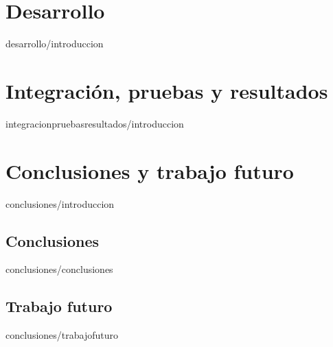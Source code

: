 \documentclass[epsbased,copyright,final,printable,covers,extendedindex,firstnumbered,tfg,gnuplot]{tfgtfmthesisuam}
\begin{document}
\chapter{Desarrollo\label{CAP:DESARROLLO}}{desarrollo/introduccion}

\chapter{Integración, pruebas y resultados\label{CAP:INTEGRACIONPRUEBASYRESULTADOS}}{integracionpruebasresultados/introduccion}

\chapter{Conclusiones y trabajo futuro\label{CAP:CONCLUSIONES}}{conclusiones/introduccion}
	\section{Conclusiones\label{SEC:CONCLUSIONES}}{conclusiones/conclusiones}
	\section{Trabajo futuro\label{SEC:TRABAJOFUTURO}}{conclusiones/trabajofuturo}
\end{document}
